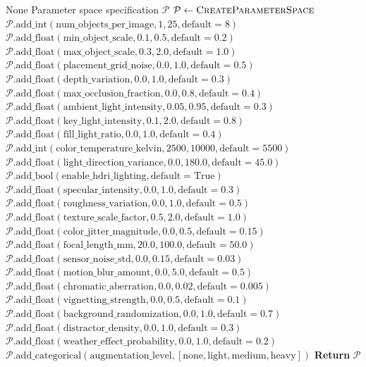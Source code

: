 \begin{algorithm}[H]
\caption{Complete Parameter Space Definition}
\label{alg:param_space}
\begin{algorithmic}[1]
\Require None
\Ensure Parameter space specification $\mathcal{P}$
\State $\mathcal{P} \gets \Call{CreateParameterSpace}{}$
\State {}
\State $\mathcal{P}.\text{add\_int}(\text{num\_objects\_per\_image}, 1, 25, \text{default}=8)$
\State $\mathcal{P}.\text{add\_float}(\text{min\_object\_scale}, 0.1, 0.5, \text{default}=0.2)$
\State $\mathcal{P}.\text{add\_float}(\text{max\_object\_scale}, 0.3, 2.0, \text{default}=1.0)$
\State $\mathcal{P}.\text{add\_float}(\text{placement\_grid\_noise}, 0.0, 1.0, \text{default}=0.5)$
\State $\mathcal{P}.\text{add\_float}(\text{depth\_variation}, 0.0, 1.0, \text{default}=0.3)$
\State $\mathcal{P}.\text{add\_float}(\text{max\_occlusion\_fraction}, 0.0, 0.8, \text{default}=0.4)$
\State {}
\State $\mathcal{P}.\text{add\_float}(\text{ambient\_light\_intensity}, 0.05, 0.95, \text{default}=0.3)$
\State $\mathcal{P}.\text{add\_float}(\text{key\_light\_intensity}, 0.1, 2.0, \text{default}=0.8)$
\State $\mathcal{P}.\text{add\_float}(\text{fill\_light\_ratio}, 0.0, 1.0, \text{default}=0.4)$
\State $\mathcal{P}.\text{add\_int}(\text{color\_temperature\_kelvin}, 2500, 10000, \text{default}=5500)$
\State $\mathcal{P}.\text{add\_float}(\text{light\_direction\_variance}, 0.0, 180.0, \text{default}=45.0)$
\State $\mathcal{P}.\text{add\_bool}(\text{enable\_hdri\_lighting}, \text{default}=\text{True})$
\State {}
\State $\mathcal{P}.\text{add\_float}(\text{specular\_intensity}, 0.0, 1.0, \text{default}=0.3)$
\State $\mathcal{P}.\text{add\_float}(\text{roughness\_variation}, 0.0, 1.0, \text{default}=0.5)$
\State $\mathcal{P}.\text{add\_float}(\text{texture\_scale\_factor}, 0.5, 2.0, \text{default}=1.0)$
\State $\mathcal{P}.\text{add\_float}(\text{color\_jitter\_magnitude}, 0.0, 0.5, \text{default}=0.15)$
\State {}
\State $\mathcal{P}.\text{add\_float}(\text{focal\_length\_mm}, 20.0, 100.0, \text{default}=50.0)$
\State $\mathcal{P}.\text{add\_float}(\text{sensor\_noise\_std}, 0.0, 0.15, \text{default}=0.03)$
\State $\mathcal{P}.\text{add\_float}(\text{motion\_blur\_amount}, 0.0, 5.0, \text{default}=0.5)$
\State $\mathcal{P}.\text{add\_float}(\text{chromatic\_aberration}, 0.0, 0.02, \text{default}=0.005)$
\State $\mathcal{P}.\text{add\_float}(\text{vignetting\_strength}, 0.0, 0.5, \text{default}=0.1)$
\State {}
\State $\mathcal{P}.\text{add\_float}(\text{background\_randomization}, 0.0, 1.0, \text{default}=0.7)$
\State $\mathcal{P}.\text{add\_float}(\text{distractor\_density}, 0.0, 1.0, \text{default}=0.3)$
\State $\mathcal{P}.\text{add\_float}(\text{weather\_effect\_probability}, 0.0, 1.0, \text{default}=0.2)$
\State $\mathcal{P}.\text{add\_categorical}(\text{augmentation\_level}, [\text{none}, \text{light}, \text{medium}, \text{heavy}])$
\State \textbf{Return} $\mathcal{P}$
\end{algorithmic}
\end{algorithm}

